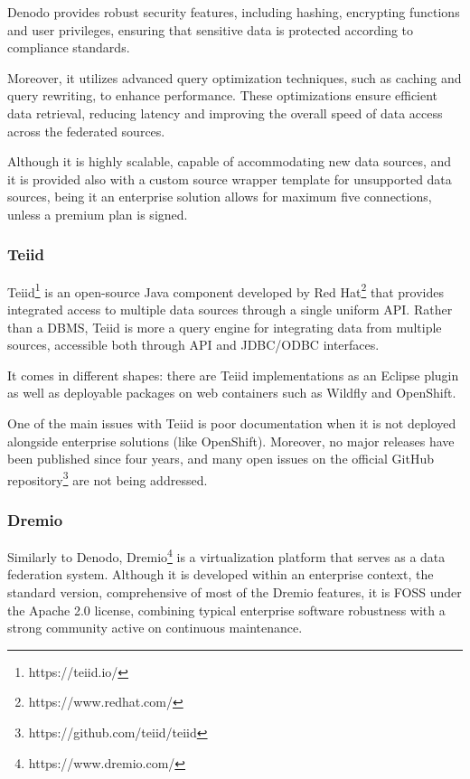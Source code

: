 Denodo provides robust security features, including hashing, encrypting functions and user privileges, ensuring that sensitive data is protected according to compliance standards.

Moreover, it utilizes advanced query optimization techniques, such as caching and query rewriting, to enhance performance. These optimizations ensure efficient data retrieval, reducing latency and improving the overall speed of data access across the federated sources.

Although it is highly scalable, capable of accommodating new data sources, and it is provided also with a custom source wrapper template for unsupported data sources, being it an enterprise solution allows for maximum five connections, unless a premium plan is signed.

\subsubsection{Teiid}
Teiid\footnote{https://teiid.io/} is an open-source Java component developed by Red Hat\footnote{https://www.redhat.com/} that provides integrated access to multiple data sources through a single uniform \ac{API}. Rather than a \ac{DBMS}, Teiid is more a query engine for integrating data from multiple sources, accessible both through \ac{API} and \ac{JDBC}/\ac{ODBC} interfaces.

It comes in different shapes: there are Teiid implementations as an Eclipse plugin as well as deployable packages on web containers such as Wildfly and OpenShift.

One of the main issues with Teiid is poor documentation when it is not deployed alongside enterprise solutions (like OpenShift). Moreover, no major releases have been published since four years, and many open issues on the official GitHub repository\footnote{https://github.com/teiid/teiid} are not being addressed.

\subsubsection{Dremio}
Similarly to Denodo, Dremio\footnote{https://www.dremio.com/} is a virtualization platform that serves as a data federation system. Although it is developed within an enterprise context, the standard version, comprehensive of most of the Dremio features, it is \ac{FOSS} under the Apache 2.0 license, combining typical enterprise software robustness with a strong community active on continuous maintenance.

